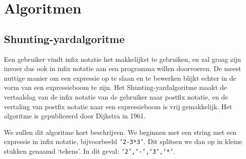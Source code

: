 \documentclass[a4paper]{article}
\begin{document}
\section{Algoritmen}
\subsection{Shunting-yardalgoritme}
Een gebruiker vindt infix notatie het makkelijkst te gebruiken, en zal graag zijn invoer dus ook in infix notatie aan een programma willen doorvoeren. De meest nuttige manier om een expressie op te slaan en te bewerken blijkt echter in de vorm van een expressieboom te zijn. Het Shunting-yardalgoritme maakt de vertaalslag van de infix notatie van de gebruiker naar postfix notatie, en de vertaling van postfix notatie naar een expressieboom is vrij gemakkelijk. Het algoritme is gepubliceerd door Dijkstra in 1961. 

We zullen dit algoritme kort beschrijven. We beginnen met een string met een expressie in infix notatie, bijvoorbeeld \texttt{`2-3*3'}. Dit splitsen we dan op in kleine stukken genaamd `tekens'. In dit geval: \texttt{`2',`-',`3',`*'}. 
\end{document}
